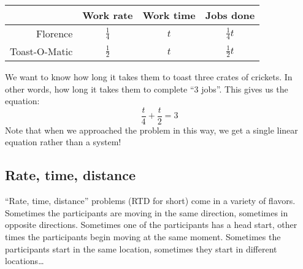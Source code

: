 \begin{center}
\begin{tabular}{r|ccc}
	& Work rate		& Work time		& Jobs done\\\hline
Florence
	& $\frac{1}{4}$	& $t$			& $\frac{1}{4}t$\\
Toast-O-Matic
	& $\frac{1}{2}$	& $t$			& $\frac{1}{2}t$\\
\end{tabular}
\end{center}

We want to know how long it takes them to toast three crates of crickets. In other words, how long it takes them to complete ``3 jobs''. This gives us the equation:
\[
\frac{t}{4} + \frac{t}{2} = 3
\]
Note that when we approached the problem in this way, we get a single linear equation rather than a system!

%
%

\subsection{Rate, time, distance}

``Rate, time, distance'' problems (RTD for short) come in a variety of flavors. Sometimes the participants are moving in the same direction, sometimes in opposite directions. Sometimes one of the participants has a head start, other times the participants begin moving at the same moment. Sometimes the participants start in the same location, sometimes they start in different locations\ldots

